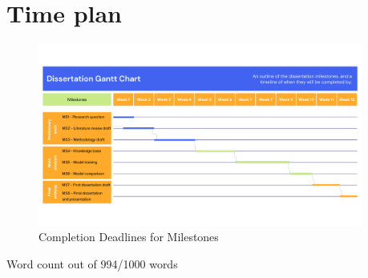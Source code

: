 \documentclass{article}
\begin{document}
\section{Time plan}
\begin{figure}[h!]
    \centering
    \includegraphics[width=0.95\textwidth,trim={0 3cm 0cm 0cm},clip]{paper/images/Diss Timeline.png}
    \caption{Completion Deadlines for Milestones}
    \label{fig:initial_framework}
\end{figure}

Word count out of 994/1000 words




\noindent\makebox[\textwidth]{\rule{\textwidth}{0.4pt}}
\end{document}
